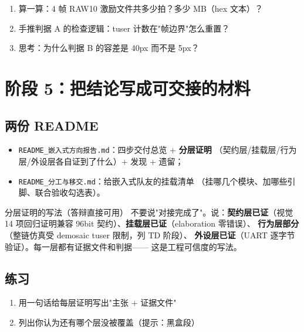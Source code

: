 \documentclass[11pt]{ctexart}
\newcommand{\code}[1]{\texttt{#1}}
\begin{document}
\begin{enumerate}
  \item 算一算：4 帧 RAW10 激励文件共多少拍？多少 MB（hex 文本）？
  \item 手推判据 A 的检查逻辑：tuser 计数在"帧边界"怎么重置？
  \item 思考：为什么判据 B 的容差是 40px 而不是 5px？
\end{enumerate}

\section{阶段 5：把结论写成可交接的材料}

\subsection{两份 README}

\begin{itemize}
  \item \code{README\_嵌入式方向报告.md}：四步交付总览 + \textbf{分层证明}
    （契约层/挂载层/行为层/外设层各自证到了什么）+ 发现 + 遗留；
  \item \code{README\_分工与移交.md}：给嵌入式队友的挂载清单
    （挂哪几个模块、加哪些引脚、联合验收勾选表）。
\end{itemize}

\begin{keybox}{分层证明的写法（答辩直接可用）}
不要说"对接完成了"。说：\textbf{契约层已证}（视觉 14 项回归证明兼容
96bit 契约）、\textbf{挂载层已证}（elaboration 零错误）、
\textbf{行为层部分}（整链仿真受 demosaic tuser 限制，列 TD 阶段）、
\textbf{外设层已证}（UART 逐字节验证）。每一层都有证据文件和判据——
这是工程可信度的写法。
\end{keybox}

\subsection{练习}

\begin{enumerate}
  \item 用一句话给每层证明写出"主张 + 证据文件"
  \item 列出你认为还有哪个层没被覆盖（提示：黑盒段）
\end{enumerate}



\end{document}
